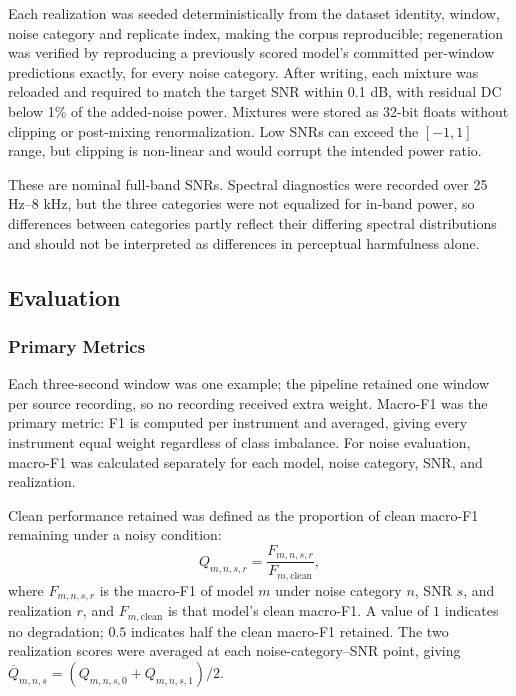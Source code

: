 \documentclass[conference]{IEEEtran}
\begin{document}
Each realization was seeded deterministically from the dataset identity, window, noise category and replicate index, making the corpus reproducible; regeneration was verified by reproducing a previously scored model's committed per-window predictions exactly, for every noise category. After writing, each mixture was reloaded and required to match the target SNR within 0.1 dB, with residual DC below 1\% of the added-noise power. Mixtures were stored as 32-bit floats without clipping or post-mixing renormalization. Low SNRs can exceed the $[-1, 1]$ range, but clipping is non-linear and would corrupt the intended power ratio.

These are nominal full-band SNRs. Spectral diagnostics were recorded over 25 Hz--8 kHz, but the three categories were not equalized for in-band power, so differences between categories partly reflect their differing spectral distributions and should not be interpreted as differences in perceptual harmfulness alone.

\subsection{Evaluation}
\subsubsection{Primary Metrics}

Each three-second window was one example; the pipeline retained one window per source recording, so no recording received extra weight. Macro-F1 was the primary metric: F1 is computed per instrument and averaged, giving every instrument equal weight regardless of class imbalance. For noise evaluation, macro-F1 was calculated separately for each model, noise category, SNR, and realization.

Clean performance retained was defined as the proportion of clean macro-F1 remaining under a noisy condition:
\begin{equation}
Q_{m,n,s,r}
=
\frac{
F_{m,n,s,r}
}{
F_{m,\mathrm{clean}}
},
\label{eq:retention}
\end{equation}
where \(F_{m,n,s,r}\) is the macro-F1 of model \(m\) under noise category \(n\), SNR \(s\), and realization \(r\), and \(F_{m,\mathrm{clean}}\) is that model's clean macro-F1. A value of \(1\) indicates no degradation; \(0.5\) indicates half the clean macro-F1 retained. The two realization scores were averaged at each noise-category--SNR point, giving \(\overline{Q}_{m,n,s}=(Q_{m,n,s,0}+Q_{m,n,s,1})/2\).
\end{document}
